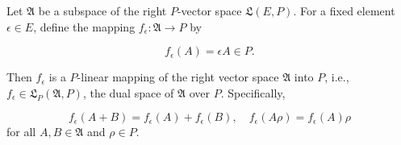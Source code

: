 Let $\mathfrak{A}$ be a subspace of the right $P$-vector space $\mathfrak{L}(E, P)$. For a fixed element $\epsilon \in E$, define the mapping $f_\epsilon : \mathfrak{A} \to P$ by

$$f_\epsilon(A) = \epsilon A \in P.$$

Then $f_\epsilon$ is a $P$-linear mapping of the right vector space $\mathfrak{A}$ into $P$, i.e., $f_\epsilon \in \mathfrak{L}_P(\mathfrak{A}, P)$, the dual space of $\mathfrak{A}$ over $P$. Specifically,

$$f_\epsilon(A + B) = f_\epsilon(A) + f_\epsilon(B), \quad f_\epsilon(A\rho) = f_\epsilon(A)\rho$$
for all $A, B \in \mathfrak{A}$ and $\rho \in P$.
